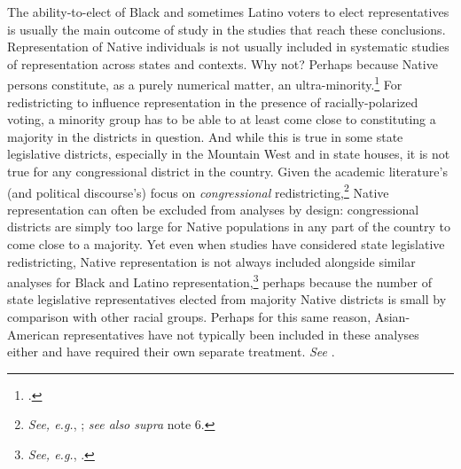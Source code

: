 \documentclass[12pt]{article}
\begin{document}
The ability-to-elect of Black and sometimes Latino voters to elect representatives is usually the main outcome of study in the studies that reach these conclusions. Representation of Native individuals is not usually included in systematic studies of representation across states and contexts. Why not? Perhaps because Native persons constitute, as a purely numerical matter, an ultra-minority.\footnote{\cite{zhang2020native}.} For redistricting to influence representation in the presence of racially-polarized voting, a minority group has to be able to at least come close to constituting a majority in the districts in question. And while this is true in some state legislative districts, especially in the Mountain West and in state houses, it is not true for any congressional district in the country. Given the academic literature's (and political discourse's) focus on \textit{congressional} redistricting,\footnote{\textit{See, e.g.}, \cite{grofman1989minority}; \textit{see also supra} note 6.} Native representation can often be excluded from analyses by design: congressional districts are simply too large for Native populations in any part of the country to come close to a majority. Yet even when studies have considered state legislative redistricting, Native representation is not always included alongside similar analyses for Black and Latino representation,\footnote{\textit{See, e.g.}, \cite{lublin2020minority}.} perhaps because the number of state legislative representatives elected from majority Native districts is small by comparison with other racial groups. Perhaps for this same reason, Asian-American representatives have not typically been included in these analyses either and have required their own separate treatment. \textit{See }\cite{lublin_wright_2024}.
\end{document}
